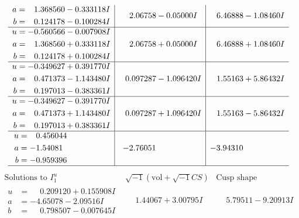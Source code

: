 \documentclass[1p]{elsarticle_modified}
\theoremstyle{definition}
\newcommand{\I}{\sqrt{-1}}
\begin{document}
$$\begin{array}{c|c|c}
\begin{aligned}
a &= \phantom{-}1.368560 - 0.333118 I \\
b &= \phantom{-}0.124178 - 0.100284 I\end{aligned}
 & \phantom{-}2.06758 - 0.05000 I & \phantom{-}6.46888 - 1.08460 I \\ \hline\begin{aligned}
u &= -0.560566 - 0.007908 I \\
a &= \phantom{-}1.368560 + 0.333118 I \\
b &= \phantom{-}0.124178 + 0.100284 I\end{aligned}
 & \phantom{-}2.06758 + 0.05000 I & \phantom{-}6.46888 + 1.08460 I \\ \hline\begin{aligned}
u &= -0.349627 + 0.391770 I \\
a &= \phantom{-}0.471373 - 1.143480 I \\
b &= \phantom{-}0.197013 - 0.383361 I\end{aligned}
 & \phantom{-}0.097287 - 1.096420 I & \phantom{-}1.55163 + 5.86432 I \\ \hline\begin{aligned}
u &= -0.349627 - 0.391770 I \\
a &= \phantom{-}0.471373 + 1.143480 I \\
b &= \phantom{-}0.197013 + 0.383361 I\end{aligned}
 & \phantom{-}0.097287 + 1.096420 I & \phantom{-}1.55163 - 5.86432 I \\ \hline\begin{aligned}
u &= \phantom{-}0.456044\phantom{ +0.000000I} \\
a &= -1.54081\phantom{ +0.000000I} \\
b &= -0.959396\phantom{ +0.000000I}\end{aligned}
 & -2.76051\phantom{ +0.000000I} & -3.94310\phantom{ +0.000000I}\\
 \hline 
 \end{array}$$\newpage$$\begin{array}{c|c|c}  
\text{Solutions to }I^u_{1}& \I (\text{vol} + \sqrt{-1}CS) & \text{Cusp shape}\\
 \hline 
\begin{aligned}
u &= \phantom{-}0.209120 + 0.155908 I \\
a &= -4.65078 - 2.09516 I \\
b &= \phantom{-}0.798507 - 0.007645 I\end{aligned}
 & \phantom{-}1.44067 + 3.00795 I & \phantom{-}5.79511 - 9.20913 I \\ \hline\begin{aligned}

\end{aligned}
\end{array}$$
\end{document}
